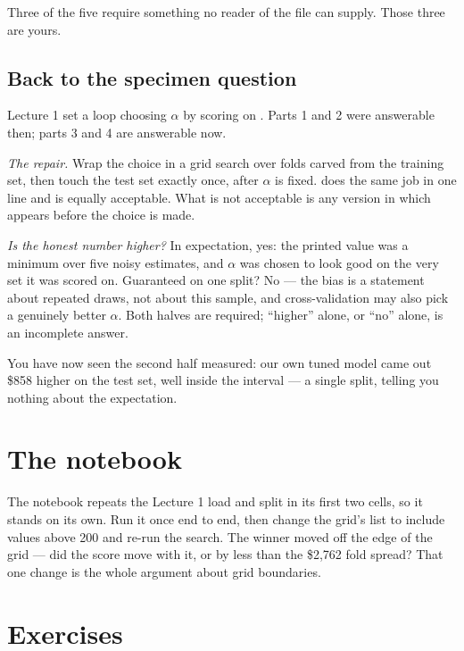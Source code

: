 \documentclass[11pt,a4paper]{article}
\begin{document}
Three of the five require something no reader of the file can supply. Those
three are yours.

\subsection{Back to the specimen question}\label{sec:specimen}

Lecture 1 set a loop choosing $\alpha$ by scoring on . Parts 1
and 2 were answerable then; parts 3 and 4 are answerable now.

\emph{The repair.} Wrap the choice in a grid search over folds carved from the
training set, then touch the test set exactly once, after $\alpha$ is fixed.
 does the same job in one line and is equally acceptable. What is
not acceptable is any version in which  appears before the choice
is made.

\emph{Is the honest number higher?} In expectation, yes: the printed value was
a minimum over five noisy estimates, and $\alpha$ was chosen to look good on
the very set it was scored on. Guaranteed on one split? No --- the bias is a
statement about repeated draws, not about this sample, and cross-validation may
also pick a genuinely better $\alpha$. Both halves are required; ``higher''
alone, or ``no'' alone, is an incomplete answer.

You have now seen the second half measured: our own tuned model came out \$858
higher on the test set, well inside the interval --- a single split, telling
you nothing about the expectation.

\section{The notebook}

\begin{trybox}[title={What to change}]
The notebook repeats the Lecture 1 load and split in its first two cells, so it
stands on its own. Run it once end to end, then change the grid's
 list to include values above 200 and re-run the search.
The winner moved off the edge of the grid --- did the score move with it, or by
less than the \$2{,}762 fold spread? That one change is the whole argument
about grid boundaries.
\end{trybox}

\section{Exercises}
\end{document}
